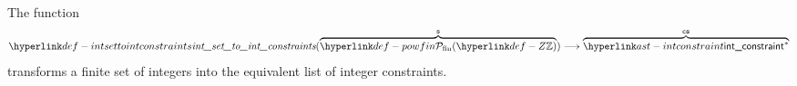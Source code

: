 \begin{mathpar}
\end{mathpar}

\begin{mathpar}
\end{mathpar}

\hypertarget{def-intsettointconstraints}{}
The function
\[
\intsettointconstraints(\overname{\powfin{\Z}}{\vs})
\aslto \overname{\intconstraint^*}{\cs}
\]
transforms a finite set of integers into the equivalent list of integer constraints.

